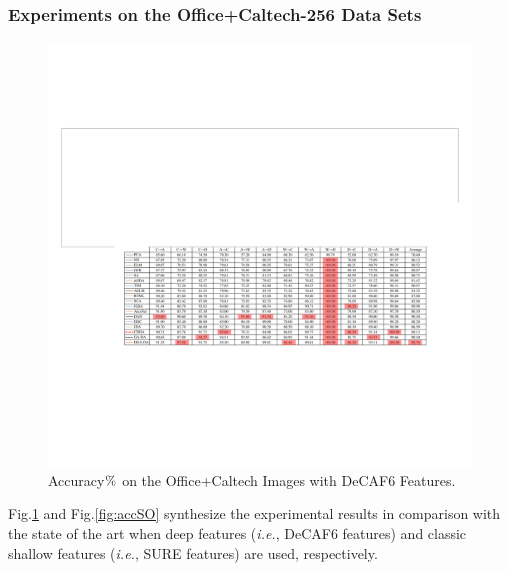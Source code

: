 \documentclass[journal,twocolumn]{IEEEtran}
\begin{document}
\begin{CJK*}{UTF8}{gkai}
\vspace{3pt}
\subsubsection{\textbf{Experiments on the Office+Caltech-256 Data Sets}}
\label{subsubsection:Experiments on the Office+Caltech-256 Data Sets}

	\begin{figure}[h!]
		\centering
		\includegraphics[width=0.9\linewidth]{DOFFICE.pdf}
		\caption { Accuracy${\rm{\% }}$ on the Office+Caltech Images with DeCAF6 Features.} 
		\label{fig:accDO}
	\end{figure} 	




Fig.\ref{fig:accDO} and Fig.\ref{fig:accSO} synthesize the experimental results in comparison with the state of the art when deep features (\textit{i.e.}, DeCAF6 features) and classic shallow features (\textit{i.e.}, SURE features)   are used, respectively.   

 



\end{CJK*}
\end{document}
